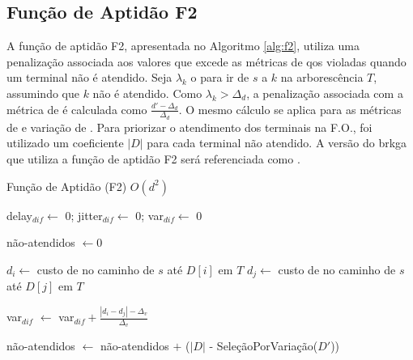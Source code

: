 \subsection{Função de Aptidão F2} \label{subsec:brkga-f2}

A  função de  aptidão F2,  apresentada  no Algoritmo  \ref{alg:f2}, utiliza  uma
penalização associada aos  valores que excede as métricas  de \gls{qos} violadas
quando um terminal não é atendido. Seja  $\lambda_k$ o {\delay} para ir de $s$ a
$k$ na  arborescência $T$, assumindo que  $k$ não é atendido.  Como $\lambda_k >
\Delta_d$, a  penalização associada com a  métrica de {\delay} é  calculada como
$\frac{d' - \Delta_d}{\Delta_d}$. O mesmo cálculo  se aplica para as métricas de
{\jitter} e variação de {\delay}. Para  priorizar o atendimento dos terminais na
F.O., foi  utilizado um  coeficiente $|D|$  para cada  terminal não  atendido. A
versão do \gls{brkga} que utiliza a  função de aptidão F2 será referenciada como
{\bfdois}.

\begin{algorithm}[!ht]
  \caption{Função de Aptidão (F2) $O(d^2)$ \label{alg:f2}}
  
  delay$_{dif} \leftarrow$ 0;
  jitter$_{dif} \leftarrow$ 0;
  var$_{dif} \leftarrow$ 0\;
  
  não-atendidos $\leftarrow 0$\;

   \label{line:for-l-j-end}

   { \label{line:for-var-begin}
     {
      $d_{i} \leftarrow$ custo de {\delay} no caminho de $s$ até $D[i]$ em $T$\;
      $d_{j} \leftarrow$ custo de {\delay} no caminho de $s$ até $D[j]$ em $T$\;
    
       { \label{line:notation-abuse}
        var$_{dif}$ $\leftarrow$ var$_{dif} + \frac{|d_i - d_j| - \Delta_v}{\Delta_v}$\;
      }
    }
  } \label{line:for-var-end}
 
  não-atendidos $\leftarrow$ não-atendidos $+$ ($|D|$ - SeleçãoPorVariação($D'$))\;

  \; \label{line:return-val}
\end{algorithm}

